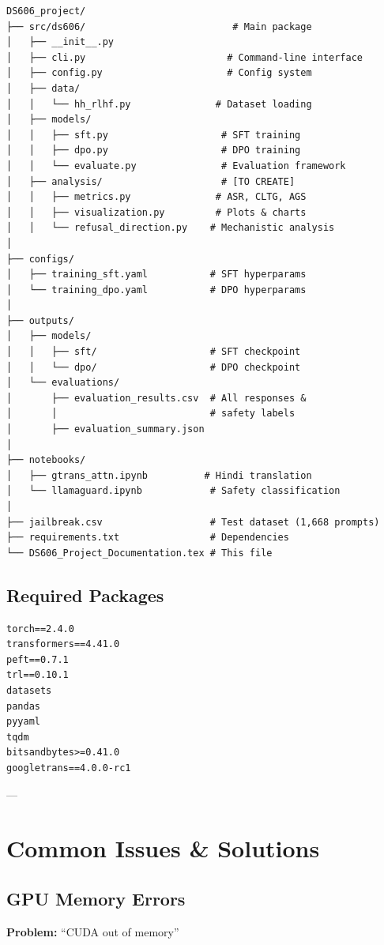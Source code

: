 \documentclass[11pt,a4paper]{article}
\begin{document}
\begin{verbatim}
DS606_project/
├── src/ds606/                          # Main package
│   ├── __init__.py
│   ├── cli.py                         # Command-line interface
│   ├── config.py                      # Config system
│   ├── data/
│   │   └── hh_rlhf.py               # Dataset loading
│   ├── models/
│   │   ├── sft.py                    # SFT training
│   │   ├── dpo.py                    # DPO training
│   │   └── evaluate.py               # Evaluation framework
│   ├── analysis/                     # [TO CREATE]
│   │   ├── metrics.py               # ASR, CLTG, AGS
│   │   ├── visualization.py         # Plots & charts
│   │   └── refusal_direction.py    # Mechanistic analysis
│
├── configs/
│   ├── training_sft.yaml           # SFT hyperparams
│   └── training_dpo.yaml           # DPO hyperparams
│
├── outputs/
│   ├── models/
│   │   ├── sft/                    # SFT checkpoint
│   │   └── dpo/                    # DPO checkpoint
│   └── evaluations/
│       ├── evaluation_results.csv  # All responses & 
│       │                           # safety labels
│       ├── evaluation_summary.json
│
├── notebooks/
│   ├── gtrans_attn.ipynb          # Hindi translation
│   └── llamaguard.ipynb            # Safety classification
│
├── jailbreak.csv                   # Test dataset (1,668 prompts)
├── requirements.txt                # Dependencies
└── DS606_Project_Documentation.tex # This file
\end{verbatim}

\subsection{Required Packages}

\begin{verbatim}
torch==2.4.0
transformers==4.41.0
peft==0.7.1
trl==0.10.1
datasets
pandas
pyyaml
tqdm
bitsandbytes>=0.41.0
googletrans==4.0.0-rc1
\end{verbatim}

---

\section{Common Issues \& Solutions}

\subsection{GPU Memory Errors}

\textbf{Problem:} ``CUDA out of memory''
\end{document}
